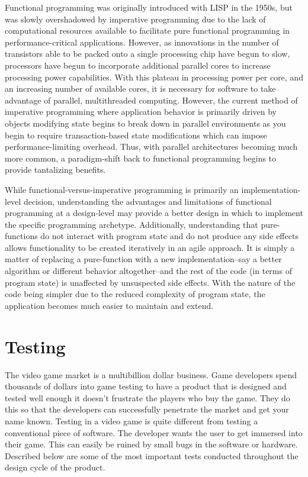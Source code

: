Functional programming was originally introduced with LISP in the 1950s, but was slowly overshadowed by imperative programming due to the lack of computational resources available to facilitate pure functional programming in performance-critical applications. However, as innovations in the number of transistors able to be packed onto a single processing chip have begun to slow, processors have begun to incorporate additional parallel cores to increase processing power capabilities. With this plateau in processing power per core, and an increasing number of available cores, it is necessary for software to take advantage of parallel, multithreaded computing. However, the current method of imperative programming where application behavior is primarily driven by objects modifying state begins to break down in parallel environments as you begin to require transaction-based state modifications which can impose performance-limiting overhead. Thus, with parallel architectures becoming much more common, a paradigm-shift back to functional programming begins to provide tantalizing benefits.

While functional-versus-imperative programming is primarily an implementation-level decision, understanding the advantages and limitations of functional programming at a design-level may provide a better design in which to implement the specific programming archetype. Additionally, understanding that pure-functions do not interact with program state and do not produce any side effects allows functionality to be created iteratively in an agile approach. It is simply a matter of replacing a pure-function with a new implementation--say a better algorithm or different behavior altogether--and the rest of the code (in terms of program state) is unaffected by unsuspected side effects. With the nature of the code being simpler due to the reduced complexity of program state, the application becomes much easier to maintain and extend.

\section{Testing}

The video game market is a multibillion dollar business. Game developers spend thousands of dollars into game testing to have a product that is designed and tested well enough it doesn't frustrate the players who buy the game.  They do this so that the developers can successfully penetrate the market and get your name known.  Testing in a video game is quite different from testing a conventional piece of software.  The developer wants the user to get immersed into their game. This can easily be ruined by small bugs in the software or hardware.  Described below are some of the most important tests conducted throughout the design cycle of the product.

